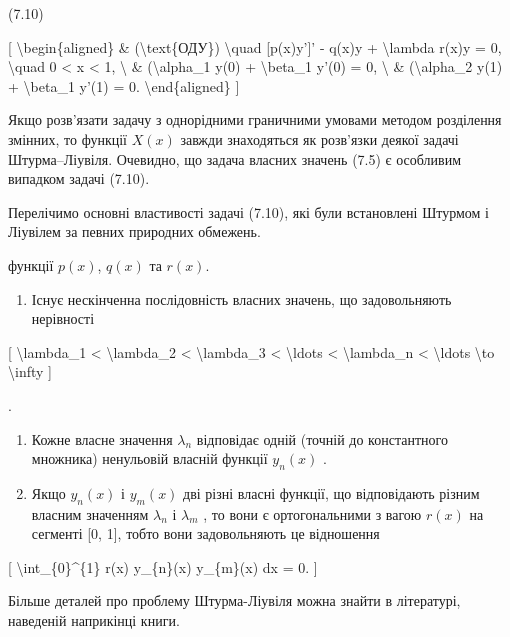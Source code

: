 \documentclass[
]{article}
\providecommand{\tightlist}{%
  \setlength{\itemsep}{0pt}\setlength{\parskip}{0pt}}
\begin{document}
(7.10)

{[} \textbackslash begin\{aligned\} \& (\textbackslash text\{ОДУ\})
\textbackslash quad {[}p(x)y'{]}' - q(x)y + \textbackslash lambda r(x)y
= 0, \textbackslash quad 0 \textless{} x \textless{} 1, \textbackslash{}
\& (\textbackslash alpha\_1 y(0) + \textbackslash beta\_1 y'(0) = 0,
\textbackslash{} \& (\textbackslash alpha\_2 y(1) +
\textbackslash beta\_1 y'(1) = 0. \textbackslash end\{aligned\} {]}

Якщо розв'язати задачу з однорідними граничними умовами методом
розділення змінних, то функції \(X(x)\) завжди знаходяться як розв'язки
деякої задачі Штурма--Ліувіля. Очевидно, що задача власних значень (7.5)
є особливим випадком задачі (7.10).

Перелічимо основні властивості задачі (7.10), які були встановлені
Штурмом і Ліувілем за певних природних обмежень.

функції \(p(x)\), \(q(x)\) та \(r(x)\).

\begin{enumerate}
\def\labelenumi{\arabic{enumi}.}
\tightlist
\item
  Існує нескінченна послідовність власних значень, що задовольняють
  нерівності
\end{enumerate}

{[} \textbackslash lambda\_1 \textless{} \textbackslash lambda\_2
\textless{} \textbackslash lambda\_3 \textless{} \textbackslash ldots
\textless{} \textbackslash lambda\_n \textless{} \textbackslash ldots
\textbackslash to \textbackslash infty {]}

.

\begin{enumerate}
\def\labelenumi{\arabic{enumi}.}
\setcounter{enumi}{1}
\item
  Кожне власне значення \(\lambda_n\) відповідає одній (точній до
  константного множника) ненульовій власній функції \(y_n(x)\) .
\item
  Якщо \(y_n(x)\) і \(y_m(x)\) дві різні власні функції, що відповідають
  різним власним значенням \(\lambda_n\) і \(\lambda_m\) , то вони є
  ортогональними з вагою \(r(x)\) на сегменті {[}0, 1{]}, тобто вони
  задовольняють це відношення
\end{enumerate}

{[} \textbackslash int\_\{0\}\^{}\{1\} r(x) y\_\{n\}(x) y\_\{m\}(x) dx =
0. {]}

Більше деталей про проблему Штурма-Ліувіля можна знайти в літературі,
наведеній наприкінці книги.
\end{document}
